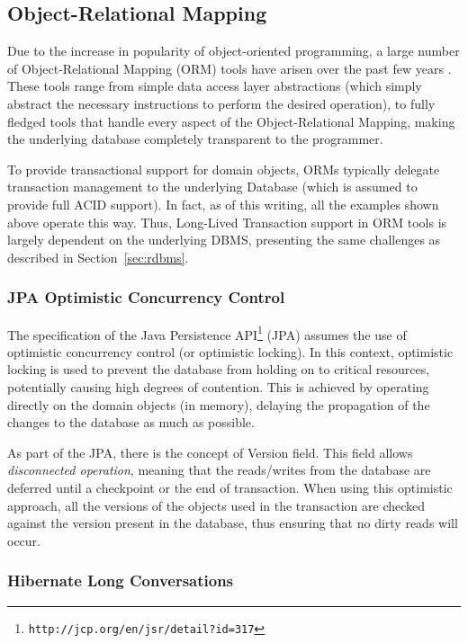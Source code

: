 \documentclass{llncs}
\begin{document}
\subsection{Object-Relational Mapping}
\label{sec:orm}

Due to the increase in popularity of object-oriented programming, a
large number of Object-Relational Mapping (ORM) tools have arisen over
the past few years \cite{orm}. These tools range from simple data
access layer abstractions (which simply abstract the necessary
instructions to perform the desired operation), to fully fledged tools
that handle every aspect of the Object-Relational Mapping, making the
underlying database completely transparent to the programmer.

To provide transactional support for domain objects, ORMs typically
delegate transaction management to the underlying Database (which is
assumed to provide full ACID support). In fact, as of this writing,
all the examples shown above operate this way. Thus, Long-Lived
Transaction support in ORM tools is largely dependent on the
underlying DBMS, presenting the same challenges as described in
Section~\ref{sec:rdbms}.

\subsubsection{JPA Optimistic Concurrency Control}

The specification of the Java Persistence
API\footnote{\texttt{http://jcp.org/en/jsr/detail?id=317}} (JPA)
assumes the use of optimistic concurrency control (or optimistic
locking). In this context, optimistic locking is used to prevent the
database from holding on to critical resources, potentially causing
high degrees of contention.  This is achieved by operating directly on
the domain objects (in memory), delaying the propagation of the
changes to the database as much as possible.

As part of the JPA, there is the concept of Version field. This field
allows {\it disconnected operation}, meaning that the reads/writes
from the database are deferred until a checkpoint or the end of
transaction. When using this optimistic approach, all the versions of
the objects used in the transaction are checked against the version
present in the database, thus ensuring that no dirty reads will occur.

\subsubsection{Hibernate Long Conversations}
\end{document}

